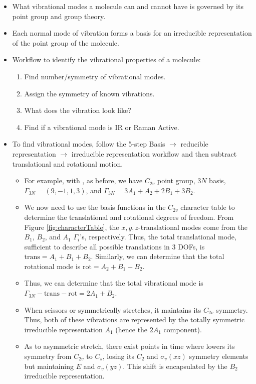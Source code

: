 \documentclass[../notes.tex]{subfiles}
\begin{document}
\begin{itemize}
    \item What vibrational modes a molecule can and cannot have is governed by its point group and group theory.
    \item Each normal mode of vibration forms a basis for an irreducible representation of the point group of the molecule.
    \item Workflow to identify the vibrational properties of a molecule:
    \begin{enumerate}
        \item Find number/symmetry of vibrational modes.
        \item Assign the symmetry of known vibrations.
        \item What does the vibration look like?
        \item Find if a vibrational mode is IR or Raman Active.
    \end{enumerate}
    \item To find vibrational modes, follow the 5-step Basis $\to$ reducible representation $\to$ irreducible representation workflow and then subtract translational and rotational motion.
    \begin{itemize}
        \item For example, with , as before, we have $C_{2v}$ point group, $3N$ basis, $\Gamma_{3N}=(9,-1,1,3)$, and $\Gamma_{3N}=3A_1+A_2+2B_1+3B_2$.
        \item We now need to use the basis functions in the $C_{2v}$ character table to determine the translational and rotational degrees of freedom. From Figure \ref{fig:characterTable}, the $x,y,z$-translational modes come from the $B_1$, $B_2$, and $A_1$ $\Gamma_i$'s, respectively. Thus, the total translational mode, sufficient to describe all possible translations in 3 DOFs, is $\text{trans}=A_1+B_1+B_2$. Similarly, we can determine that the total rotational mode is $\text{rot}=A_2+B_1+B_2$.
        \item Thus, we can determine that the total vibrational mode is $\Gamma_{3N}-\text{trans}-\text{rot}=2A_1+B_2$.
        \item When  scissors or symmetrically stretches, it maintains its $C_{2v}$ symmetry. Thus, both of these vibrations are represented by the totally symmetric irreducible representation $A_1$ (hence the $2A_1$ component).
        \item As to asymmetric stretch, there exist points in time where  lowers its symmetry from $C_{2v}$ to $C_s$, losing its $C_2$ and $\sigma_v(xz)$ symmetry elements but maintaining $E$ and $\sigma_v(yz)$. This shift is encapsulated by the $B_2$ irreducible representation.

\end{itemize}
\end{itemize}
\end{document}
